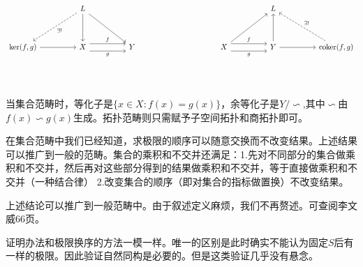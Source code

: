      \[
        \centering
        \begin{tikzcd}
            && L &&&&&&&& L \\
            \\
            {\mathrm{ker}(f,g)} && X && Y &&&& X && Y && {\mathrm{coker}(f,g)} \\
            \\
            &&&&&& {}
            \arrow["g"', shift right=2, from=3-9, to=3-11]
            \arrow["f", shift left=2, from=3-9, to=3-11]
            \arrow[from=3-11, to=3-13]
            \arrow["g"', shift right=2, from=3-3, to=3-5]
            \arrow["f", shift left=2, from=3-3, to=3-5]
            \arrow[from=1-3, to=3-3]
            \arrow[from=1-3, to=3-5]
            \arrow["{\exists !}", dashed, from=1-3, to=3-1]
            \arrow[from=3-1, to=3-3]
            \arrow[from=3-9, to=1-11]
            \arrow[from=3-11, to=1-11]
            \arrow["{\exists !}"', dashed, from=3-13, to=1-11]
        \end{tikzcd}
     \]

      当集合范畴时，等化子是$\{x \in X:f(x)=g(x)\}$，余等化子是$Y/\backsim$,其中$\backsim$由$f(x)\backsim g(x)$生成。拓扑范畴则只需赋予子空间拓扑和商拓扑即可。

      在集合范畴中我们已经知道，求极限的顺序可以随意交换而不改变结果。上述结果可以推广到一般的范畴。集合的乘积和不交并还满足：1.先对不同部分的集合做乘积和不交并，然后再对这些部分得到的结果做乘积和不交并，等于直接做乘积和不交并（一种结合律）  \quad 2.改变集合的顺序（即对集合的指标做置换）不改变结果。

      上述结论可以推广到一般范畴中。由于叙述定义麻烦，我们不再赘述。可查阅李文威66页。

      证明办法和极限换序的方法一模一样。唯一的区别是此时确实不能认为固定$S$后有一样的极限。因此验证自然同构是必要的。但是这类验证几乎没有悬念。

